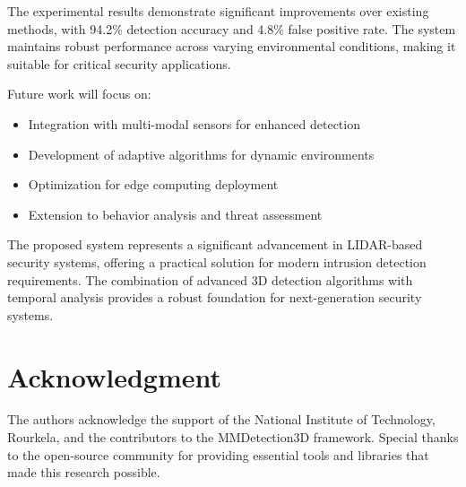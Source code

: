 \documentclass[conference]{IEEEtran}
\begin{document}
The experimental results demonstrate significant improvements over existing methods, with 94.2\% detection accuracy and 4.8\% false positive rate. The system maintains robust performance across varying environmental conditions, making it suitable for critical security applications.

Future work will focus on:
\begin{itemize}
\item Integration with multi-modal sensors for enhanced detection
\item Development of adaptive algorithms for dynamic environments
\item Optimization for edge computing deployment
\item Extension to behavior analysis and threat assessment
\end{itemize}

The proposed system represents a significant advancement in LIDAR-based security systems, offering a practical solution for modern intrusion detection requirements. The combination of advanced 3D detection algorithms with temporal analysis provides a robust foundation for next-generation security systems.

\section*{Acknowledgment}
The authors acknowledge the support of the National Institute of Technology, Rourkela, and the contributors to the MMDetection3D framework. Special thanks to the open-source community for providing essential tools and libraries that made this research possible.
\end{document}
